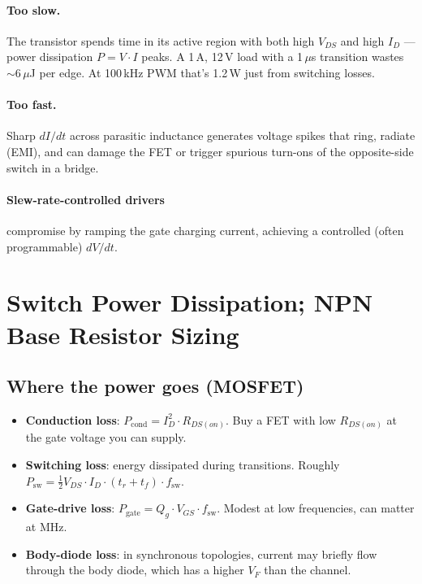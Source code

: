 \documentclass[11pt,a4paper]{article}
\begin{document}
\paragraph{Too slow.} The transistor spends time in its active region with
both high $V_{DS}$ and high $I_D$ --- power dissipation $P = V \cdot I$ peaks.
A 1\,A, 12\,V load with a 1\,$\mu$s transition wastes $\sim 6\,\mu$J per
edge. At 100\,kHz PWM that's 1.2\,W just from switching losses.

\paragraph{Too fast.} Sharp $dI/dt$ across parasitic inductance generates
voltage spikes that ring, radiate (EMI), and can damage the FET or trigger
spurious turn-ons of the opposite-side switch in a bridge.

\paragraph{Slew-rate-controlled drivers} compromise by ramping the gate
charging current, achieving a controlled (often programmable) $dV/dt$.

\section{Switch Power Dissipation; NPN Base Resistor Sizing}

\subsection{Where the power goes (MOSFET)}

\begin{itemize}[leftmargin=*]
    \item \textbf{Conduction loss}: $P_{\text{cond}} = I_D^2 \cdot R_{DS(on)}$.
    Buy a FET with low $R_{DS(on)}$ at the gate voltage you can supply.
    \item \textbf{Switching loss}: energy dissipated during transitions.
    Roughly $P_{\text{sw}} = \frac{1}{2} V_{DS} \cdot I_D \cdot (t_r + t_f)
    \cdot f_{\text{sw}}$.
    \item \textbf{Gate-drive loss}: $P_{\text{gate}} = Q_g \cdot V_{GS} \cdot
    f_{\text{sw}}$. Modest at low frequencies, can matter at MHz.
    \item \textbf{Body-diode loss}: in synchronous topologies, current may
    briefly flow through the body diode, which has a higher $V_F$ than the
    channel.
\end{itemize}
\end{document}
